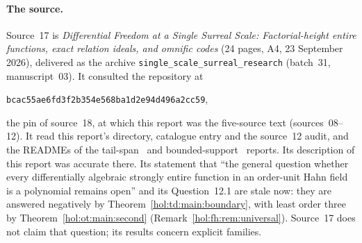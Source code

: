 \documentclass[11pt]{article}
\numberwithin{equation}{section}
\theoremstyle{definition}
\theoremstyle{remark}
\begin{document}
\paragraph{The source.}
Source~17 is \emph{Differential Freedom at a Single Surreal Scale:
Factorial-height entire functions, exact relation ideals, and omnific codes}
(24 pages, A4, 23 September 2026), delivered as the archive
\texttt{single\_scale\_surreal\_research} (batch~31, manuscript~03). It
consulted the repository at
\begin{center}\small\texttt{bcac55ae6fd3f2b354e568ba1d2e94d496a2cc59},\end{center}
the pin of source~18, at which this report was the five-source text
(sources~08--12). It read this report's directory, catalogue entry and the
source~12 audit, and the READMEs of the tail-span~\cite{repotail} and
bounded-support~\cite{repobst} reports. Its description of this report was
accurate there. Its statement that ``the general question whether every
differentially algebraic strongly entire function in an order-unit Hahn field
is a polynomial remains open'' and its Question~12.1 are stale now: they are
answered negatively by Theorem~\ref{hol:td:main:boundary}, with least order
three by Theorem~\ref{hol:ot:main:second} (Remark~\ref{hol:fh:rem:universal}).
Source~17 does not claim that question; its results concern explicit families.
\end{document}
